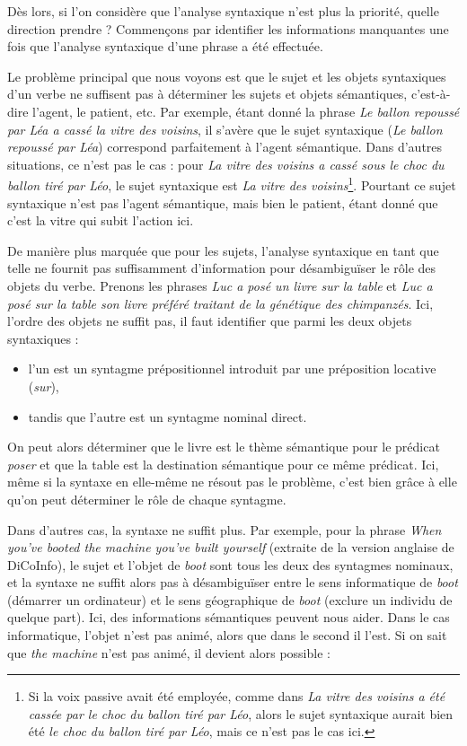 Dès lors, si l'on considère que l'analyse syntaxique n'est plus la priorité,
quelle direction prendre ? Commençons par identifier les informations
manquantes une fois que l'analyse syntaxique d'une phrase a été effectuée.

Le problème principal que nous voyons est que le sujet et les objets
syntaxiques d'un verbe ne suffisent pas à déterminer les sujets et objets
sémantiques, c'est-à-dire l'agent, le patient, etc. Par exemple, étant donné la
phrase \textit{Le ballon repoussé par Léa a cassé la vitre des voisins}, il
s'avère que le sujet syntaxique (\textit{Le ballon repoussé par Léa})
correspond parfaitement à l'agent sémantique.  Dans d'autres situations, ce
n'est pas le cas : pour \textit{La vitre des voisins a cassé sous le choc du
ballon tiré par Léo}, le sujet syntaxique est \textit{La vitre des
voisins}\footnote{Si la voix passive avait été employée, comme dans \textit{La
    vitre des voisins a été cassée par le choc du ballon tiré par Léo}, alors
le sujet syntaxique aurait bien été \textit{le choc du ballon tiré par Léo},
mais ce n'est pas le cas ici.}. Pourtant ce sujet syntaxique n'est pas l'agent
sémantique, mais bien le patient, étant donné que c'est la vitre qui subit
l'action ici.

De manière plus marquée que pour les sujets, l'analyse syntaxique en tant que
telle ne fournit pas suffisamment d'information pour désambiguïser le rôle des
objets du verbe.  Prenons les phrases \textit{Luc a posé un livre sur la table}
et \textit{Luc a posé sur la table son livre préféré traitant de la génétique des
chimpanzés}.  Ici, l'ordre des objets ne suffit pas, il faut identifier que
parmi les deux objets syntaxiques :

\begin{itemize}
    \item l'un est un syntagme prépositionnel introduit par une préposition
        locative (\textit{sur}),
    \item tandis que l'autre est un syntagme nominal direct.
\end{itemize}

On peut alors déterminer que le livre est le thème sémantique pour le prédicat
\textit{poser} et que la table est la destination sémantique pour ce même
prédicat. Ici, même si la syntaxe en elle-même ne résout pas le problème, c'est
bien grâce à elle qu'on peut déterminer le rôle de chaque syntagme.

Dans d'autres cas, la syntaxe ne suffit plus. Par exemple, pour la phrase
\textit{When you've booted the machine you've built yourself} (extraite de la
version anglaise de DiCoInfo), le sujet et l'objet de \textit{boot} sont tous
les deux des syntagmes nominaux, et la syntaxe ne suffit alors pas à
désambiguïser entre le sens informatique de \textit{boot} (démarrer un
ordinateur) et le sens géographique de \textit{boot} (exclure un individu de
quelque part). Ici, des informations sémantiques peuvent nous aider. Dans le
cas informatique, l'objet n'est pas animé, alors que dans le second il l'est.
Si on sait que \textit{the machine} n'est pas animé, il devient alors possible
:

